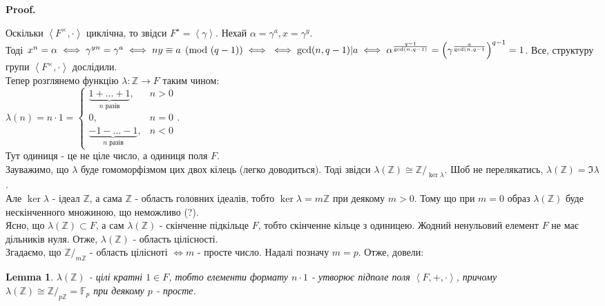 \documentclass[a4paper, 14pt]{extarticle}
\makeatletter
\theoremstyle{theoremdd}
\theoremstyle{theoremdd}
\theoremstyle{theoremdd}
\theoremstyle{theoremdd}
\theoremstyle{theoremdd}
\theoremstyle{theoremdd}
\theoremstyle{theoremdd}
\newtheorem{lemma}[theorem]{Lemma}
\theoremstyle{theoremdd}
\def\qed{$\blacksquare$}
\renewenvironment{proof}[1][Proof.\\]{\par
\pushQED{\hfill \qed}%
\normalfont \topsep6\p@\@plus6\p@\relax
\trivlist
\item\relax
{\bfseries
#1\@addpunct{.}}\hspace\labelsep\ignorespaces
}{%
\popQED\endtrivlist\@endpefalse
}
\makeatother
\begin{document}
\begin{proof}
Оскільки $\left< F^\times, \cdot \right>$ циклічна, то звідси $F^\star = \left< \gamma \right>$. Нехай $\alpha = \gamma^a, x = \gamma^y$.\\
Тоді $x^n = \alpha \iff \gamma^{yn} = \gamma^a \iff ny \equiv a \pmod {(q-1)} \iff \\ \iff \gcd(n,q-1) | a \iff \alpha^{\frac{q-1}{\gcd(n,q-1)}} = \left(\gamma^{\frac{a}{\gcd(n,q-1}} \right)^{q-1} = 1$.
\end{proof}
Все, структуру групи $\left< F^\times,\cdot \right>$ дослідили.
\bigskip \\
Тепер розглянемо функцію $\lambda: \mathbb{Z} \to F$ таким чином:\\
$\lambda(n) = n \cdot 1 = \begin{cases} \underbrace{1+\dots+1}_{n\text{ разів}}, & n > 0 \\ 0, & n = 0 \\ \underbrace{-1-\dots-1}_{n\text{ разів}}, & n < 0 \end{cases}$.\\
Тут одиниця - це не ціле число, а одиниця поля $F$.\\
Зауважимо, що $\lambda$ буде гомоморфізмом цих двох кілець (легко доводиться). Тоді звідси $\lambda(\mathbb{Z}) \cong \mathbb{Z}/_{\ker \lambda}$. Шоб не перелякатись, $\lambda(\mathbb{Z}) = \Im \lambda$.\\
Але $\ker \lambda$ - ідеал $\mathbb{Z}$, а сама $\mathbb{Z}$ - область головних ідеалів, тобто $\ker \lambda = m\mathbb{Z}$ при деякому $m > 0$. Тому що при $m = 0$ образ $\lambda(\mathbb{Z})$ буде нескінченного множиною, що неможливо (?).\\
Ясно, що $\lambda(\mathbb{Z}) \subset F$, а сам $\lambda(\mathbb{Z})$ - скінченне підкільце $F$, тобто скінченне кільце з одиницею. Жодний ненульовий елемент $F$ не має дільників нуля. Отже, $\lambda(\mathbb{Z})$ - область цілісності.\\
Згадаємо, що $\mathbb{Z}/_{m\mathbb{Z}}$ - область цілісноті $\iff m$ - просте число. Надалі позначу $m = p$. Отже, довели:

\begin{lemma}
$\lambda(\mathbb{Z})$ - цілі кратні $1 \in F$, тобто елементи формату $n \cdot 1$ - утворює підполе поля $\left< F, +, \cdot \right>$, причому\\
$\lambda(\mathbb{Z}) \cong \mathbb{Z}/_{p \mathbb{Z}} = \mathbb{F}_p$ при деякому $p$ - просте.
\end{lemma}
\end{document}
